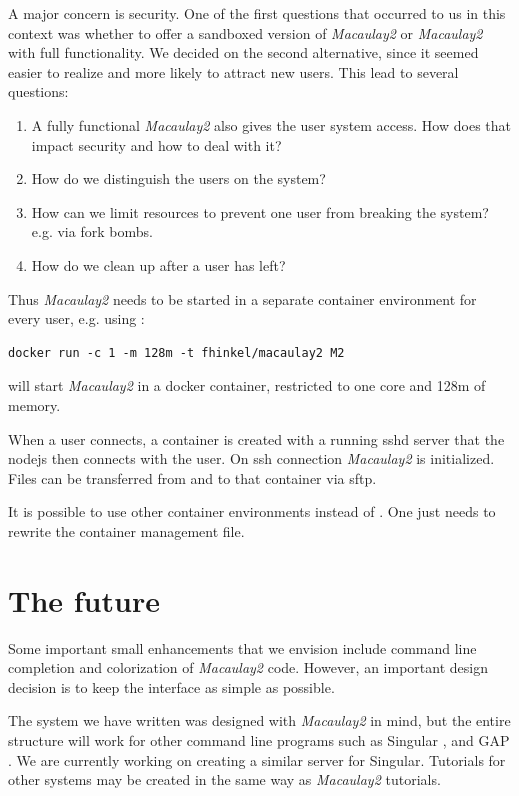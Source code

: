 \documentclass[]{article}
\def\M2{{\it Macaulay2}}
\begin{document}
A major concern is security.
One of the first questions that occurred to us in this context was
whether to offer a sandboxed version of \M2 or \M2 with full
functionality.
We decided on the second alternative, since it seemed
easier to realize and more likely to attract new users.  This lead to
several questions:

\begin{enumerate}
\item A fully functional \M2 also gives the user system access. How does that impact security and how to deal with it?
\item How do we distinguish the users on the system?
\item How can we limit resources to prevent one user from breaking the system? e.g. via fork bombs.
\item How do we clean up after a user has left?
\end{enumerate}

Thus \M2 needs to be started in a separate container environment for every user, e.g. using \cite{docker}:
\begin{verbatim}
docker run -c 1 -m 128m -t fhinkel/macaulay2 M2
\end{verbatim}
will start \M2 in a docker container, restricted to one core and 128m of memory.

When a user connects, a container is created with a running sshd server that
the nodejs then connects with the user. On ssh connection \M2 is initialized.
Files can be transferred from and to that container via sftp.

It is possible to use other container environments instead of \cite{docker}.
One just needs to rewrite the container management file.



\section{The future}

Some important small enhancements that we envision include command
line completion and colorization of \M2 code.  However, an important
design decision is to keep the interface as simple as possible.

The system we have written was designed with \M2 in mind, but 
the entire structure will work for other command line programs such as Singular \cite{singular},
and GAP \cite{GAP4}.  We are currently working on creating a similar server for Singular.
Tutorials for other systems may be created in the same way as \M2 tutorials.
\end{document}
